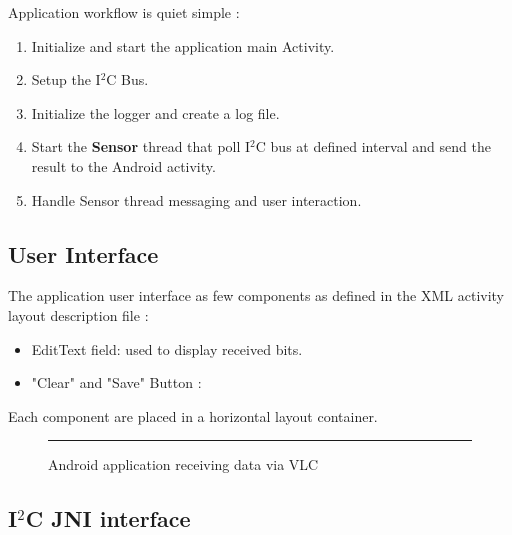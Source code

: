 Application workflow is quiet simple :
\begin{enumerate}
\item Initialize and start the application main Activity.
\item Setup the I$^2$C Bus.
\item Initialize the logger and create a log file.
\item Start the \textbf{Sensor} thread that poll I$^2$C bus at defined interval and send the result to the Android activity. 
\item Handle Sensor thread messaging and user interaction.
\end{enumerate}

\subsection{User Interface}

The application user interface as few components as defined in the XML activity layout description file :
\begin{itemize}
\item EditText field: used to display received bits.
\item "Clear" and "Save" Button :
\end{itemize}

Each component are placed in a horizontal layout container.

\begin{figure}[htbp]
    \centering
    \rule{35em}{0.5pt}
    \caption{Android application receiving data via VLC}
    \label{fig:androidapp}
\end{figure}

\subsection{I$^2$C JNI interface}

